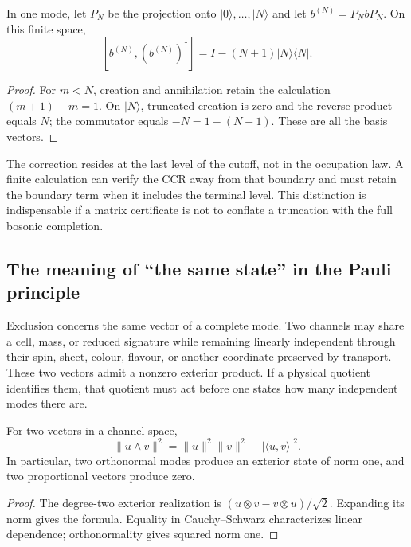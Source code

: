 \begin{proposition}
\label{vi:prop:corte-bosonico}
In one mode, let \(P_N\) be the projection onto
\(|0\rangle,\ldots,|N\rangle\) and let \(b^{(N)}=P_NbP_N\).
On this finite space,
\[
 [b^{(N)},(b^{(N)})^\dagger]
 =I-(N+1)|N\rangle\langle N|.
\]
\end{proposition}
\begin{proof}
For \(m<N\), creation and annihilation retain the calculation
\((m+1)-m=1\). On \(|N\rangle\), truncated creation is zero
and the reverse product equals \(N\); the commutator equals
\(-N=1-(N+1)\). These are all the basis vectors.
\end{proof}

The correction resides at the last level of the cutoff, not in the
occupation law. A finite calculation can verify the CCR away from
that boundary and must retain the boundary term when it includes
the terminal level. This distinction is indispensable if a matrix
certificate is not to conflate a truncation with the full bosonic
completion.

\subsection{The meaning of “the same state” in the Pauli principle}
\label{vi:subsec:pauli-etiquetas-hojas}

Exclusion concerns the same vector of a complete mode. Two channels
may share a cell, mass, or reduced signature while remaining linearly
independent through their spin, sheet, colour, flavour, or another
coordinate preserved by transport. These two vectors admit a nonzero
exterior product. If a physical quotient identifies them, that quotient
must act before one states how many independent modes there are.

\begin{proposition}
\label{vi:prop:pauli-gram}
For two vectors in a channel space,
\[
 \|u\wedge v\|^2
 =\|u\|^2\|v\|^2-|\langle u,v\rangle|^2.
\]
In particular, two orthonormal modes produce an exterior state of norm
one, and two proportional vectors produce zero.
\end{proposition}
\begin{proof}
The degree-two exterior realization is
\((u\otimes v-v\otimes u)/\sqrt2\). Expanding its norm gives
the formula. Equality in Cauchy--Schwarz characterizes linear
dependence; orthonormality gives squared norm one.
\end{proof}

